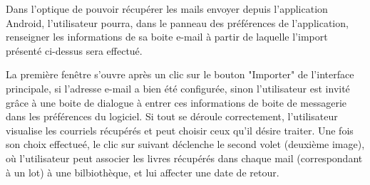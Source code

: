 \begin{figure}[htbp]
  \begin{center}
    \leavevmode
  \end{center}
\end{figure}

Dans l'optique de pouvoir récupérer les mails envoyer depuis l'application Android, l'utilisateur pourra, dans le panneau des préférences de l'application, renseigner les informations de sa boite e-mail à partir de laquelle l'import présenté ci-dessus sera effectué.

\newpage{}

\begin{figure}[htbp]
  \begin{center}
    \leavevmode
    \hspace{1cm}
    \leavevmode
  \end{center}
\end{figure}

La première fenêtre s'ouvre après un clic sur le bouton "Importer" de l'interface principale, si l'adresse e-mail a bien été configurée, sinon l'utilisateur est invité grâce à une boite de dialogue à entrer ces informations de boite de messagerie dans les préférences du logiciel. Si tout se déroule correctement, l'utilisateur visualise les courriels récupérés et peut choisir ceux qu'il désire traiter. Une fois son choix effectueé, le clic sur suivant déclenche le second volet (deuxième image), où l'utilisateur peut associer les livres récupérés dans chaque mail (correspondant à un lot) à une bilbiothèque, et lui affecter une date de retour.

